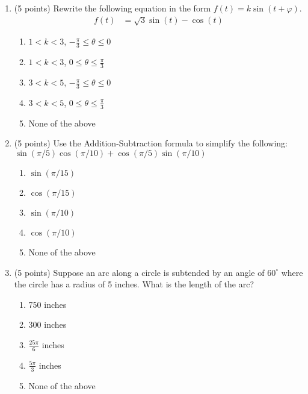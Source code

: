 \documentclass[fleqn]{article}
\renewcommand{\thispagestyle}[1]{}
\begin{document}
\begin{enumerate}
\vspace{0.5in}

\item 
(5 points) Rewrite the following equation in the form $f(t) = k\sin(t + \varphi)$.
\begin{align*}
f(t) &= \sqrt{3}\sin(t) - \cos(t)
\end{align*}

\begin{enumerate}
\item $1 < k < 3$, $-\frac{\pi}{3}\leq \theta \leq 0$

\item $1 < k < 3$, $0 \leq \theta \leq \frac{\pi}{3}$

\item $3 < k < 5$, $-\frac{\pi}{3} \leq \theta \leq 0$

\item $3 < k < 5$, $0 \leq \theta \leq \frac{\pi}{3}$

\item None of the above

\end{enumerate}

\vspace{0.5in}

\item
(5 points) Use the Addition-Subtraction formula to simplify the following: $\sin(\pi/5)\cos(\pi/10) + \cos(\pi/5)\sin(\pi/10)$

\begin{enumerate}
\item $\sin(\pi/15)$

\item $\cos(\pi/15)$

\item $\sin(\pi/10)$

\item $\cos(\pi/10)$

\item None of the above

\end{enumerate}

\pagebreak
\thispagestyle{fancy}{
}

\item
(5 points) Suppose an arc along a circle is subtended by an angle of $60^{\circ}$ where the circle has a radius of 5 inches.  What is the length of the arc?

\begin{enumerate}
\item 750 inches
\item 300 inches
\item $\frac{25\pi}{6}$ inches
\item $\frac{5\pi}{3}$ inches
\item None of the above
\end{enumerate}


\end{enumerate}
\end{document}
